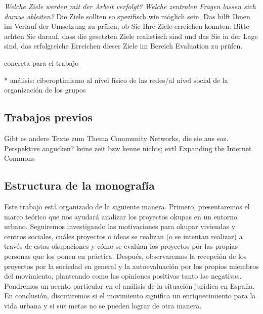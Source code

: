 \noindent \emph{Welche Ziele werden mit der Arbeit verfolgt? Welche zentralen Fragen lassen sich daraus ableiten?}
	Die Ziele sollten so spezifisch wie möglich sein. Das hilft Ihnen im Verlauf der Umsetzung zu prüfen, ob Sie Ihre Ziele erreichen konnten. Bitte achten Sie darauf, dass die gesetzten Ziele realistisch sind und das Sie in der Lage sind, das erfolgreiche Erreichen dieser Ziele im Bereich Evaluation zu prüfen.


concreta para el trabajo

* análisis: ciberoptimismo al nivel físico de las redes/al nivel social de la organización de los grupos

\subsection{Trabajos previos}

Gibt es andere Texte zum Thema Community Networks, die sie aus soz. Perspektive angucken?
keine zeit bzw kenne nichts; evtl Expanding the Internet Commons

\subsection{Estructura de la monografía}

Este trabajo está organizado de la siguiente manera.
Primero, presentaremos el marco teórico que nos ayudará analizar los proyectos okupas en un entorno urbano.
Seguiremos investigando las motivaciones para okupar viviendas y centros sociales,
cuáles proyectos o ideas se realizan (o se intentan realizar) a través de estas okupaciones
y cómo se evalúan los proyectos por las propias personas que los ponen en práctica.
Después, observaremos la recepción de los proyectos por la sociedad en general y la autoevaluación por los propios miembros del movimiento, planteando como las opiniones positivas tanto las negativas.
Pondremos un acento particular en el análisis de la situación jurídica en España.
En conclusión, discutiremos si el movimiento significa un enriquecimiento para la vida urbana y si sus metas no se pueden lograr de otra manera.

